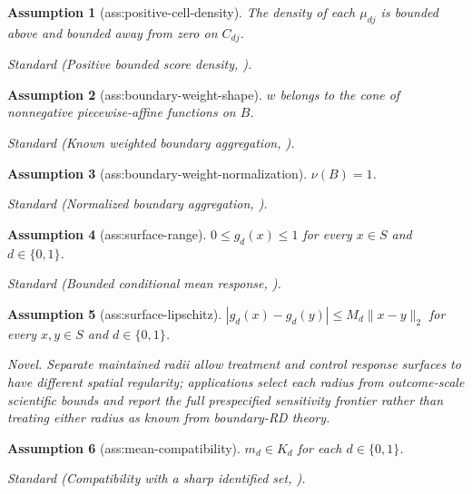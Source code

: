 \documentclass{article}
\newtheorem{assumption}{Assumption}
\begin{document}
\begin{assumption}[ass:positive-cell-density]\label{ass:positive-cell-density}
The density of each \(\mu_{dj}\) is bounded above and bounded away from zero on \(C_{dj}\).
\par\smallskip\noindent\emph{Standard} (Positive bounded score density, \cite{CattaneoTitiunikYu2025LocationBoundary}).
\end{assumption}

\begin{assumption}[ass:boundary-weight-shape]\label{ass:boundary-weight-shape}
\(w\) belongs to the cone of nonnegative piecewise-affine functions on \(B\).
\par\smallskip\noindent\emph{Standard} (Known weighted boundary aggregation, \cite{CattaneoTitiunikYu2025AggregationBoundary}).
\end{assumption}

\begin{assumption}[ass:boundary-weight-normalization]\label{ass:boundary-weight-normalization}
\(\nu(B)=1\).
\par\smallskip\noindent\emph{Standard} (Normalized boundary aggregation, \cite{CattaneoTitiunikYu2025AggregationBoundary}).
\end{assumption}

\begin{assumption}[ass:surface-range]\label{ass:surface-range}
\(0\le g_d(x)\le1\) for every \(x\in S\) and \(d\in\{0,1\}\).
\par\smallskip\noindent\emph{Standard} (Bounded conditional mean response, \cite{QiuStoye2026BoundaryDecision}).
\end{assumption}

\begin{assumption}[ass:surface-lipschitz]\label{ass:surface-lipschitz}
\(|g_d(x)-g_d(y)|\le M_d\|x-y\|_2\) for every \(x,y\in S\) and \(d\in\{0,1\}\).
\par\smallskip\noindent\emph{Novel.} Separate maintained radii allow treatment and control response surfaces to have different spatial regularity; applications select each radius from outcome-scale scientific bounds and report the full prespecified sensitivity frontier rather than treating either radius as known from boundary-RD theory.
\end{assumption}

\begin{assumption}[ass:mean-compatibility]\label{ass:mean-compatibility}
\(m_d\in K_d\) for each \(d\in\{0,1\}\).
\par\smallskip\noindent\emph{Standard} (Compatibility with a sharp identified set, \cite{BeresteanuMolchanovMolinari2011RandomSets}).
\end{assumption}
\end{document}
